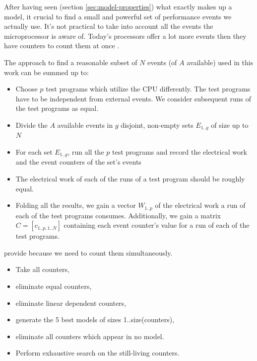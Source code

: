 \label{sec:min-events}

After having seen (section \ref{sec:model-properties}) what exactly makes up a
model, it crucial to find a small and powerful set of performance events we
actually use. It's not practical to take into account all the events the
microprocessor is aware of. Today's processors offer a lot more events then they
have counters to count them at once \cite{intel2011softdev1}.

The approach to find a reasonable subset of $N$ events (of $A$ available) used
in this work can be summed up to:

\begin{itemize}

\item Choose $p$ test programs which utilize the CPU differently. The test
programs have to be independent from external events. We consider subsequent
runs of the test programs as equal.

\item Divide the $A$ available events in $g$ disjoint, non-empty sets $E_{1..g}$
of size up to $N$

\item For each set $E_{1..g}$, run all the $p$ test programs and record the
electrical work and the event counters of the set's events

\item The electrical work of each of the runs of a test program should be
roughly equal.

\item Folding all the results, we gain a vector $W_{1..p}$ of the electrical
work a run of each of the test programs consumes. Additionally, we gain a matrix
$C = [c_{1..p,1..N}]$ containing each event counter's value for a run of each of
the test programs.

\end{itemize}

provide because we need to count them simultaneously. 

\begin{itemize}

\item Take all counters,

\item eliminate equal counters,

\item eliminate linear dependent counters,

\item generate the 5 best models of sizes 1..size(counters),

\item eliminate all counters which appear in no model.

\item Perform exhaustive search on the still-living counters.

\end{itemize}


